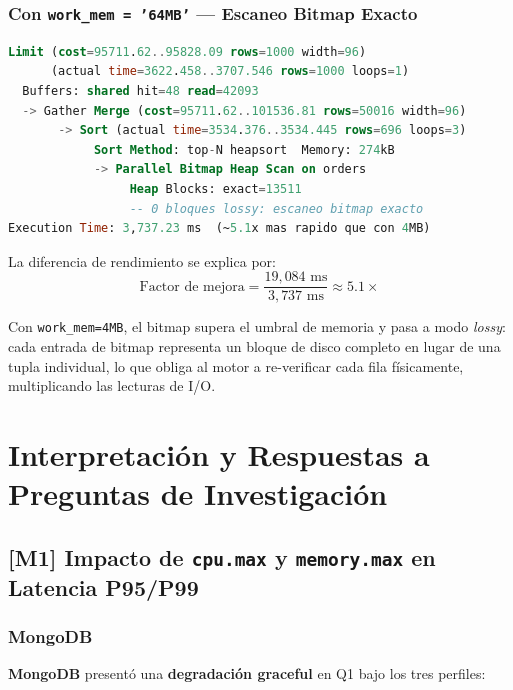 \documentclass[12pt,a4paper]{article}
\newcommand{\mongo}{\textcolor{mongogreen}{\textbf{MongoDB}}}
\begin{document}
\subsubsection{Con \texttt{work\_mem = '64MB'} — Escaneo Bitmap Exacto}

\begin{lstlisting}[language=SQL, caption={EXPLAIN ANALYZE Q2 con work\_mem=64MB — 0 bloques lossy ($5.1\times$ más rápido)}]
Limit (cost=95711.62..95828.09 rows=1000 width=96)
      (actual time=3622.458..3707.546 rows=1000 loops=1)
  Buffers: shared hit=48 read=42093
  -> Gather Merge (cost=95711.62..101536.81 rows=50016 width=96)
       -> Sort (actual time=3534.376..3534.445 rows=696 loops=3)
            Sort Method: top-N heapsort  Memory: 274kB
            -> Parallel Bitmap Heap Scan on orders
                 Heap Blocks: exact=13511
                 -- 0 bloques lossy: escaneo bitmap exacto
Execution Time: 3,737.23 ms  (~5.1x mas rapido que con 4MB)
\end{lstlisting}

La diferencia de rendimiento se explica por:
\[
  \text{Factor de mejora} = \frac{19{,}084\text{ ms}}{3{,}737\text{ ms}} \approx \mathbf{5.1\times}
\]

Con \texttt{work\_mem=4MB}, el bitmap supera el umbral de memoria y pasa a modo \textit{lossy}: cada entrada de bitmap representa un bloque de disco completo en lugar de una tupla individual, lo que obliga al motor a re-verificar cada fila físicamente, multiplicando las lecturas de I/O.

\section{Interpretación y Respuestas a Preguntas de Investigación}

\subsection{[M1] Impacto de \texttt{cpu.max} y \texttt{memory.max} en Latencia P95/P99}

\subsubsection{MongoDB}

\mongo{} presentó una \textbf{degradación graceful} en Q1 bajo los tres perfiles:
\end{document}
